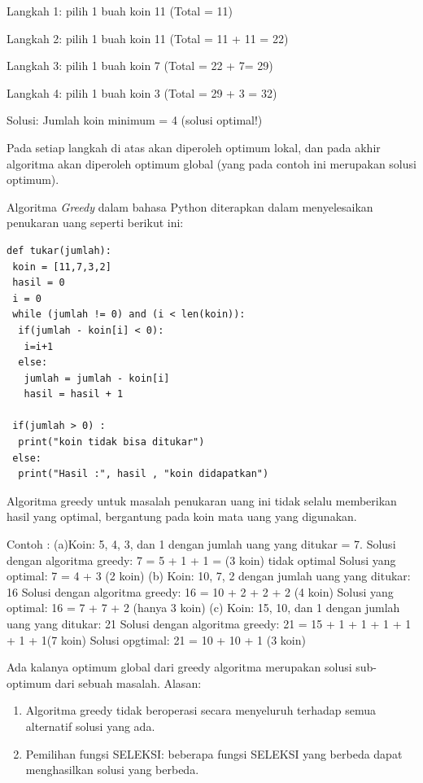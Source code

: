 Langkah 1: pilih 1 buah koin 11  (Total = 11)

Langkah 2: pilih 1 buah koin 11   (Total = 11 + 11 = 22)
	
Langkah 3: pilih 1 buah koin 7  (Total = 22 + 7= 29)  

Langkah 4: pilih 1 buah koin 3  (Total = 29 + 3 = 32)  

Solusi: Jumlah koin minimum = 4 (solusi optimal!)

Pada setiap langkah di atas akan diperoleh optimum lokal, dan pada akhir algoritma akan diperoleh optimum global (yang pada contoh ini merupakan solusi optimum).

Algoritma \textit{Greedy} dalam bahasa Python diterapkan dalam menyelesaikan penukaran uang seperti berikut ini:

\lstset{language=Python}
\label{lst:CoinchangeProblem}
\begin{lstlisting}[frame=single]
def tukar(jumlah):
 koin = [11,7,3,2]
 hasil = 0
 i = 0
 while (jumlah != 0) and (i < len(koin)):
  if(jumlah - koin[i] < 0):
   i=i+1
  else:
   jumlah = jumlah - koin[i]
   hasil = hasil + 1

 if(jumlah > 0) :
  print("koin tidak bisa ditukar")
 else:
  print("Hasil :", hasil , "koin didapatkan")	
\end{lstlisting}

Algoritma greedy untuk masalah penukaran uang ini  tidak selalu memberikan hasil yang optimal, bergantung pada koin mata uang yang digunakan. 
\begin{flushleft}
Contoh :\break
\break
(a)Koin: 5, 4, 3, dan 1 dengan jumlah uang yang ditukar = 7.
\break
Solusi dengan algoritma greedy: 7 = 5 + 1 + 1		=	(3 koin)  tidak optimal
\break
Solusi yang optimal: 7 = 4 + 3	(2 koin)
\break
\break
(b)  Koin: 10, 7, 2 dengan jumlah uang yang ditukar: 16
\break
Solusi dengan algoritma greedy: 16 = 10 + 2 + 2 + 2 (4 koin)
\break
Solusi yang optimal: 16 = 7 + 7 + 2	(hanya 3 koin)
\break
\break
(c) Koin: 15, 10, dan 1 dengan jumlah uang yang ditukar: 21
\break
Solusi dengan algoritma greedy: 21 = 15 + 1 + 1 + 1 + 1 + 1	+ 1(7 koin)
\break
Solusi opgtimal: 21 = 10 + 10	+ 1	(3 koin)
\break
\end{flushleft}

Ada kalanya optimum global dari greedy algoritma merupakan solusi sub-optimum dari sebuah masalah. Alasan:
\begin{enumerate}
\item Algoritma greedy tidak beroperasi secara menyeluruh terhadap semua alternatif solusi yang ada.  
\item	Pemilihan fungsi SELEKSI: beberapa fungsi SELEKSI yang berbeda dapat menghasilkan solusi yang berbeda. 
\end{enumerate}


